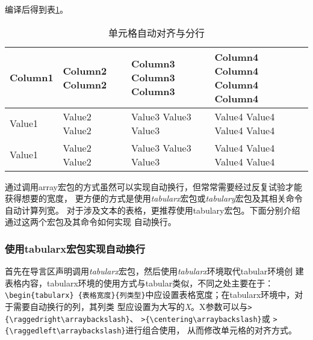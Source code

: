 编译后得到表\ref{tb11}。

\begin{table}[h]
    \centering
    \begin{tabular}{|>{\raggedright\arraybackslash}m{2.3cm}|>{\centering\arraybackslash}m{2.3cm}|>{\centering}m{2.3cm}|>{\raggedleft\arraybackslash}m{2.3cm}|}
        \hline
        Column1 & Column2 Column2 & Column3 Column3 Column3 & Column4 Column4 Column4 Column4 \tabularnewline
        \hline
        Value1  & Value2 Value2   & Value3 Value3 Value3    & Value4 Value4 Value4 Value4 \tabularnewline
        \hline
        Value1  & Value2 Value2   & Value3 Value3 Value3    & Value4 Value4 Value4 Value4 \tabularnewline
        \hline
    \end{tabular}
    \caption{单元格自动对齐与分行}
    \label{tb11}
\end{table}

通过调用array宏包的方式虽然可以实现自动换行，但常常需要经过反复试验才能获得想要的宽度，
更方便的方式是使用\emph{tabularx}宏包或\emph{tabulary}宏包及其相关命令自动计算列宽。
对于涉及文本的表格，更推荐使用tabulary宏包。下面分别介绍通过这两个宏包及其命令如何实现
自动换行。

\subsubsection{使用tabularx宏包实现自动换行}

首先在导言区声明调用\emph{tabularx}宏包，然后使用\emph{tabularx}环境取代tabular环境创
建表格内容，tabularx环境的使用方式与tabular类似，不同之处主要在于：\texttt{\textbackslash{}begin\{tabularx\}
    \{表格宽度\}\{列类型\}}中应设置表格宽度；在tabularx环境中，对于需要自动换行的列，其列类
型应设置为大写的\emph{X}。X参数可以与\texttt{>\{\textbackslash{}raggedright\textbackslash{}arraybackslash\}}、
\texttt{>\{\textbackslash{}centering\textbackslash{}arraybackslash\}}或
\texttt{>\{\textbackslash{}raggedleft\textbackslash{}arraybackslash\}}进行组合使用，
从而修改单元格的对齐方式。

